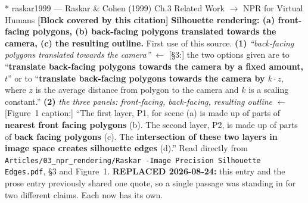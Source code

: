 \documentclass[11pt, a4paper]{article}
\makeatletter
\newcounter{citentry}
\newcommand{\citentry@core}[7]{%
  \stepcounter{citentry}
  \begingroup
  \sbox{\citentry@measurebox}{%
    \begin{minipage}{\linewidth}
      \noindent\colorbox{konstanzblue}{\parbox{\dimexpr\linewidth-2\fboxsep}{%
        \vspace{3pt}
        \textbf{\#\thecitentry \quad #2} \hfill \textit{#3}
        \vspace{3pt}
      }}
      \vspace{3pt}
      \noindent\begin{tabular}{@{}p{2.7cm} p{\dimexpr\linewidth-3cm}@{}}
        \textit{\small Sentence in thesis:} & #4 \\[5pt]
        \textbf{Usage:}\hfill       & #5 \\[5pt]
        \textit{\small Original source:}     & #6 \\[5pt]
        \textbf{How to check:}             & #7 \\
      \end{tabular}
      \vspace{5pt}
      \rule{10pt}{10pt}\quad \textbf{Validated} --- I have read the original and agree it supports the sentence.
    \end{minipage}%
  }%
  \Needspace{\dimexpr\ht\citentry@measurebox+\dp\citentry@measurebox\relax}%
  \endgroup
  \vspace{10pt}
  \noindent\colorbox{konstanzblue}{\parbox{\dimexpr\linewidth-2\fboxsep}{%
    \vspace{3pt}
    \textcolor{white}{\textbf{\#\thecitentry \quad #2}} \hfill \textcolor{white}{\textit{#3}}
    \vspace{3pt}
  }}
  \vspace{3pt}
  \noindent\begin{tabular}{@{}p{2.7cm} p{\dimexpr\linewidth-3cm}@{}}
    \textit{\small Sentence in thesis:} & \textcolor{darkgreen}{#4} \\[5pt]
    \textbf{Usage:}\hfill       & #5 \\[5pt]
    \textit{\small Original source:}     & \textcolor{darkred}{#6} \\[5pt]
    \textbf{How to check:}             & #7 \\
  \end{tabular}
  \vspace{5pt}
  \noindent\CheckBox[name=verified\thecitentry, width=10pt, height=10pt, bordercolor={0 0 0}, borderwidth=0.75, backgroundcolor={1 1 1}#1]{}\quad \textbf{Validated} --- I have read the original and agree it supports the sentence.
  \vspace{3pt}
  \noindent\textcolor{midgray}{\rule{\linewidth}{0.4pt}}
}
\newcommand{\citentry}{\@ifstar{\citentry@core{, checked}}{\citentry@core{}}}
\makeatother
\begin{document}
\begin{Form}
\citentry*
  {raskar1999 --- Raskar \& Cohen (1999)}
  {Ch.3 Related Work $\rightarrow$ NPR for Virtual Humans}
  {\textbf{[Block covered by this citation]} \textbf{Silhouette rendering: (a) front-facing polygons, (b) back-facing polygons translated towards the camera, (c) the resulting outline.}}
  {First use of this source.}
  {\textbf{(1)} \emph{``back-facing polygons translated towards the camera''} $\leftarrow$ [\S3:] the two options given are to ``\textbf{translate back-facing polygons towards the camera by a fixed amount, $t$}'' or to ``\textbf{translate back-facing polygons towards the camera by $k\cdot z$}, where $z$ is the average distance from polygon to the camera and $k$ is a scaling constant.'' \quad \textbf{(2)} \emph{the three panels: front-facing, back-facing, resulting outline} $\leftarrow$ [Figure~1 caption:] ``The first layer, P1, for scene (a) is made up of parts of \textbf{nearest front facing polygons} (b). The second layer, P2, is made up of parts of \textbf{back facing polygons} (c). The \textbf{intersection of these two layers in image space creates silhouette edges} (d).''}
  {Read directly from \texttt{\footnotesize Articles/03\_npr\_rendering/Raskar -Image Precision Silhouette Edges.pdf}, \S3 and Figure~1. \textbf{REPLACED 2026-08-24:} this entry and the prose entry previously shared one quote, so a single passage was standing in for two different claims. Each now has its own.}


\end{Form}
\end{document}
